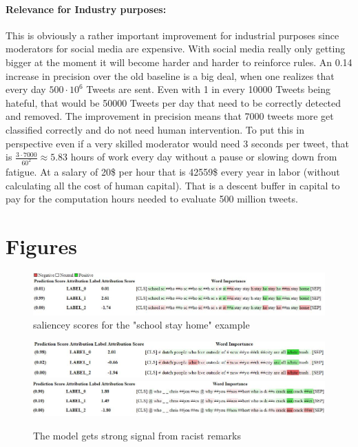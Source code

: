 \documentclass[11pt,a4paper]{article}
\begin{document}
\paragraph{Relevance for Industry purposes:}
This is obviously a rather important improvement for industrial purposes since moderators for social media are expensive. With 
social media really only getting bigger at the moment it will become harder and harder to reinforce rules.
An 0.14 increase in precision over the old baseline is a big deal, when one realizes that every day $500 \cdot 10^6$ Tweets are sent.
Even with 1 in every 10000 Tweets being hateful, that would be 50000 Tweets per day that need to be correctly detected and removed.
The improvement in precision means that 7000 tweets more get classified correctly and do not need human intervention.
To put this in perspective even if a very skilled moderator would need 3 seconds per tweet, that is 
$\frac{3 \cdot 7000}{60^2} \approx 5.83$ hours of work every day without a pause or slowing down from fatigue.
At a salary of 20\$ per hour that is 42559\$ every year in labor (without calculating all the cost of human capital).
That is a descent buffer in capital to pay for the computation hours needed to evaluate 500 million tweets.





\clearpage 
\appendix

\section{Figures}
\begin{figure}[!ht]
  \includegraphics[width=2\linewidth]{./tables-figures/school-confusion-viz.JPG} 
  \caption{saliencey scores for the "school stay home" example}
  \label{fig:school-saliency}
\end{figure}

\begin{figure}[!ht]
  \includegraphics[width=2\linewidth]{./tables-figures/white-trash-example.JPG} 
  \includegraphics[width=2\linewidth]{./tables-figures/racism-example.JPG} 
  \caption{The model gets strong signal from racist remarks}
  \label{fig:racism-example}
\end{figure}

\end{document}

